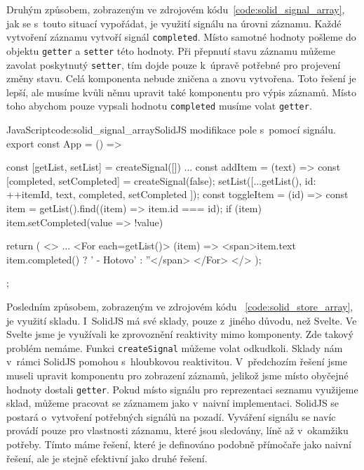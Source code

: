 \documentclass[
  master,
  program=ainf,
  printversion,
  tables=false,
  sourcecodes,
  glossaries,
  index
]{kidiplom}
\begin{document}
Druhým způsobem, zobrazeným ve zdrojovém kódu~\ref{code:solid_signal_array}, jak se s~touto situací vypořádat, 
je využití signálu na úrovni záznamu. Každé vytvoření
záznamu vytvoří signál {\tt completed}. Místo samotné hodnoty pošleme do objektu {\tt getter} a {\tt setter} této hodnoty.
Při přepnutí stavu záznamu můžeme zavolat poskytnutý {\tt setter}, tím dojde pouze k~úpravě potřebné pro projevení
změny stavu. Celá komponenta nebude zničena a znovu vytvořena. Toto řešení je lepší, ale musíme kvůli němu
upravit také komponentu pro výpis záznamů. Místo toho abychom pouze vypsali hodnotu {\tt completed} musíme volat
{\tt getter}.

  \begin{kicode}{JavaScript}{code:solid_signal_array}{SolidJS modifikace pole s~pomocí signálu.}
    export const App = () => {
      const [getList, setList] = createSignal([])
      ...
      const addItem = (text) => {
        const [completed, setCompleted] = createSignal(false); 
        setList([...getList(), { id: ++itemId, text, completed, setCompleted }]);
      }
      const toggleItem = (id) => {
        const item = getList().find((item) => item.id === id);
        if (item) item.setCompleted(value => !value)
      }

      return (
        <>
          ...
          <For each={getList()}>
            {(item) => {<span>{item.text} {item.completed() ? ' - Hotovo' : ''</span>} }}
          </For>
        </>
      );
    };
\end{kicode}

Posledním způsobem, zobrazeným ve zdrojovém kódu ~\ref{code:solid_store_array}, je využití skladu. 
I~SolidJS má své sklady, pouze z~jiného důvodu, než Svelte. Ve Svelte
jsme je využívali ke zprovoznění reaktivity mimo komponenty. Zde takový problém nemáme. Funkci {\tt createSignal}
můžeme volat odkudkoli. Sklady nám v~rámci SolidJS pomohou s~hloubkovou reaktivitou. V~předchozím řešení 
jsme museli upravit komponentu pro zobrazení záznamů, jelikož jsme místo obyčejné hodnoty dostali {\tt getter}.
Pokud místo signálu pro reprezentaci seznamu využijeme sklad, můžeme pracovat se záznamem jako v~naivní
implementaci. SolidJS se postará o~vytvoření potřebných signálů na pozadí. Vyváření signálu se navíc provádí
pouze pro vlastnosti záznamu, které jsou sledovány, líně až v~okamžiku potřeby. Tímto máme řešení, které
je definováno podobně přímočaře jako naivní řešení, ale je stejně efektivní jako druhé řešení.
\end{document}
